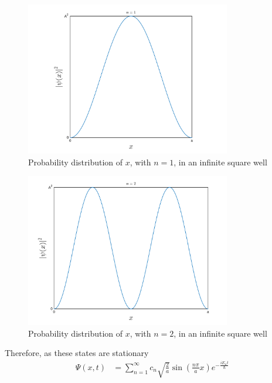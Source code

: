 \documentclass[titlepage, fleqn, a4paper, 12pt, twoside]{article}
\theoremstyle{definition}
\theoremstyle{theorem}
\begin{document}
\begin{figure}[h]
	\centering
	\includegraphics[width = 0.8\textwidth]{fig-probability_distributions_in_infinite_potential_wells_n=1.pdf}
	\caption{Probability distribution of $x$, with $n = 1$, in an infinite square well}
	\label{fig:Probability_distribution_of_$x$,_with_$n_=_1$,_in_an_infinite_square_well}
\end{figure}

\begin{figure}[h]
	\centering
	\includegraphics[width = 0.8\textwidth]{fig-probability_distributions_in_infinite_potential_wells_n=2.pdf}
	\caption{Probability distribution of $x$, with $n = 2$, in an infinite square well}
	\label{fig:Probability_distribution_of_$x$,_with_$n_=_2$,_in_an_infinite_square_well}
\end{figure}
Therefore, as these states are stationary
\begin{align*}
	\Psi(x,t) &= \sum\limits_{n = 1}^{\infty} c_n \sqrt{\frac{2}{a}} \sin\left( \frac{n \pi}{a} x \right) e^{-\frac{i E_n t}{\hbar}}
\end{align*}
\end{document}

